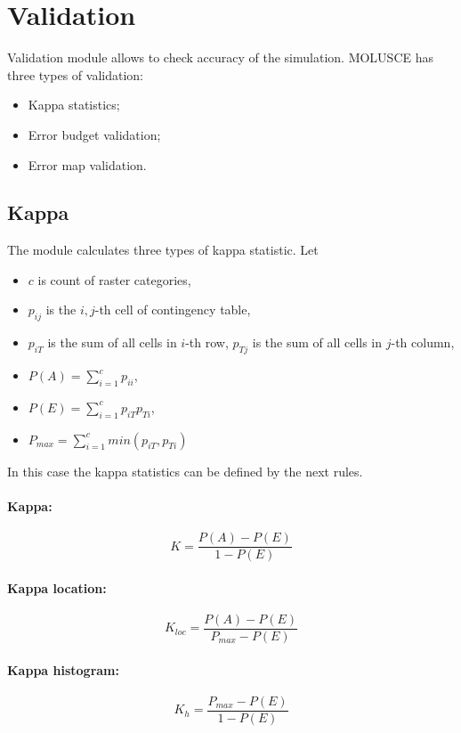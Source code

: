 \documentclass{report}
\begin{document}
\section{Validation}\label{sec:validation}

Validation module allows to check accuracy of the simulation. MOLUSCE has three types of validation:
\begin{itemize}
    \item Kappa statistics;
    \item Error budget validation;
    \item Error map validation.
\end{itemize}

\subsection{Kappa}
The module calculates three types of kappa statistic.
Let
\begin{itemize}
  \item $c$ is count of raster categories,
  \item $p_{ij}$ is the $i,j$-th cell of contingency table,
  \item $p_{iT}$ is the sum of all cells in $i$-th row, $p_{Tj}$ is the sum of all cells in $j$-th column,
  \item $P(A)=\sum _{i=1}^{c}p_{ii}$,
  \item $P(E)=\sum _{i=1}^{c}p_{iT}p_{Ti}$,
  \item $P_{max}=\sum _{i=1}^{c}min(p_{iT},p_{Ti})$ 
\end{itemize}

In this case the kappa statistics can be defined by the next rules.

\paragraph{Kappa:}
$$
K={\frac {P(A)-P(E)}{1-P(E)}}
$$

\paragraph{Kappa location:}
$$
K_{loc}={\frac {P(A)-P(E)}{P_{max}-P(E)}}
$$


\paragraph{Kappa histogram:}
$$
K_{h}={\frac {P_{max}-P(E)}{1-P(E)}}
$$
\end{document}
